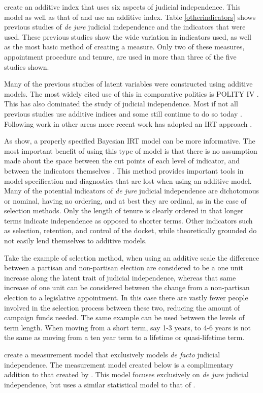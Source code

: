 \documentclass[JohnsonMADraft2.tex]{subfiles}
\begin{document}
\doublespacing\normalsize
\citet*{Melton2014} create an additive index that uses six aspects of judicial independence.  This model as well as that of \citet*{Feld2003} and \citet*{Keith2002b} use an additive index.  Table \ref{otherindicators} shows previous studies of \textit{de jure} judicial independence and the indicators that were used.  These previous studies show the wide variation in indicators used, as well as the most basic method of creating a measure.  Only two of these measures, appointment procedure and tenure, are used in more than three of the five studies shown.

Many of the previous studies of latent variables were constructed using additive models.  The most widely cited use of this in comparative politics is POLITY IV \citep{Polity}.  This has also dominated the study of judicial independence.  Most if not all previous studies use additive indices \citep{Feld2003,Keith2002a,Laporta2004} and some still continue to do so today \citep{Melton2014}.  Following work in other areas more recent work has adopted an IRT approach \citep{Martin2002,Treier2008,Schnakenberg2014,Linzer2014,Fariss2014}.

As \citet{Linzer2014} show, a  properly specified Bayesian IRT model can be more informative.  The most important benefit of using this type of model is that there is no assumption made about the space between the cut points of each level of indicator, and between the indicators themselves \citep{Jackman2008,Schnakenberg2014}.  This method provides important tools in model specification and diagnostics that are lost when using an additive model.  Many of the potential indicators of \textit{de jure} judicial independence are dichotomous or nominal, having no ordering, and at best they are ordinal, as in the case of selection methods.  Only the length of tenure is clearly ordered in that longer terms indicate independence as opposed to shorter terms.  Other indicators such as selection, retention, and control of the docket, while theoretically grounded do not easily lend themselves to additive models.

Take the example of selection method, when using an additive scale the difference between a partisan and non-partisan election are considered to be a one unit increase along the latent trait of judicial independence, whereas that same increase of one unit can be considered between the change from a non-partisan election to a legislative appointment.  In this case there are vastly fewer people involved in the selection process between these two, reducing the amount of campaign funds needed.  The same example can be used between the levels of term length.  When moving from a short term, say 1-3 years, to 4-6 years is not the same as moving from a ten year term to a lifetime or quasi-lifetime term.

\citet*{Linzer2014} create a measurement model that exclusively models \textit{de facto} judicial independence.  The measurement model created below is a complimentary addition to that created by \citeauthor{Linzer2014}.  This model focuses exclusively on \textit{de jure} judicial independence, but uses a similar statistical model to that of \citeauthor{Linzer2014}.  


%
%
\end{document}

